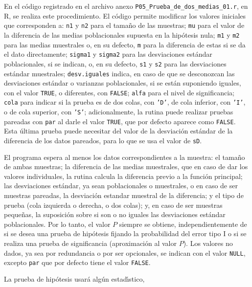 \begin{solucion}
 En el c\'odigo registrado en el archivo anexo
 \texttt{P05\_Prueba\_de\_dos\_medias\_01.r}, en R,
 se realiza este procedimiento.
 El c\'odigo permite modificar los valores iniciales
 que corresponden a:
 \texttt{n1} y \texttt{n2} para el tama\~no de las muestras;
 \texttt{mu} para el valor de la diferencia de las medias
 poblacionales supuesta en la hip\'otesis nula;
 \texttt{m1} y \texttt{m2} para las medias muestrales o,
 en su defecto, \texttt{m} para la diferencia de estas
 si se da el dato directamente;
 \texttt{sigma1} y \texttt{sigma2} para las desviaciones est\'andar
 poblacionales, si se indican,
 o, en su defecto, \texttt{s1} y \texttt{s2}
 para las desviaciones est\'andar muestrales;
 \texttt{desv.iguales} indica,
 en caso de que se desconozcan las desviaciones est\'andar
 o varianzas poblacionales, si se est\'an suponiendo iguales,
 con el valor \texttt{TRUE}, o diferentes, con \texttt{FALSE};
 \texttt{alfa} para el nivel de significancia;
 \texttt{cola} para indicar si la prueba es de dos colas,
 con \texttt{'D'}, de cola inferior, con \texttt{'I'},
 o de cola superior, con \texttt{'S'};
 adicionalmente, la rutina puede realizar pruebas pareadas
 con \texttt{par} al darle el valor \texttt{TRUE},
 que por defecto aparece como \texttt{FALSE}.
 Esta \'ultima prueba puede necesitar del valor de la desviaci\'on
 est\'andar de la diferencia de los datos pareados,
 para lo que se usa el valor de \texttt{sD}.
 \par 
 El programa espera al menos los datos correspondientes
 a la muestra:
 el tama\~no de ambas muestras;
 la diferencia de las medias muestrales,
 que en caso de dar los valores individuales,
 la rutina calcula la diferencia previo a la funci\'on principal;
 las desviaciones est\'andar, ya sean poblacionales
 o muestrales, o en caso de ser muestras pareadas,
 la desviaci\'on estandar muestral de la diferencia;
 y el tipo de prueba (cola izquierda o derecha, o dos colas);
 y, en caso de ser muestras peque\~nas,
 la suposici\'on sobre si son o no iguales
 las desviaciones est\'andar poblacionales.
 Por lo tanto, el valor $P$ siempre se obtiene,
 independientemente de si se desea una prueba de hip\'otesis
 fijando la probabilidad del error tipo I
 o si se realiza una prueba de significancia
 (aproximaci\'on al valor $P$).
 Los valores no dados, ya sea por redundancia o por ser opcionales,
 se indican con el valor \texttt{NULL},
 excepto \texttt{par} que por defecto tiene el valor \texttt{FALSE}.
 \par 
 La prueba de hip\'otesis usar\'a alg\'un estad\'{\i}stico,

\end{solucion}
